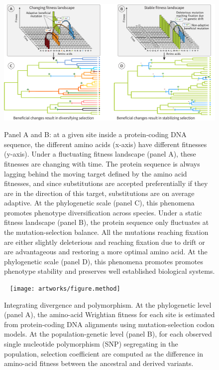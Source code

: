 \documentclass{article}
\begin{document}
    \begin{figure}[!ht]
        \
        \centering
        \includegraphics[width=\textwidth, page=1] {artworks/figure.fitness-landscape}
        \caption{
            Panel A and B: at a given site inside a protein-coding DNA sequence, the different amino acids (x-axis) have different fitnesses (y-axis).
            Under a fluctuating fitness landscape (panel A), these fitnesses are changing with time.
            The protein sequence is always lagging behind the moving target defined by the amino acid fitnesses, and since substitutions are accepted preferentially if they are in the direction of this target, substitutions are on average adaptive.
            At the phylogenetic scale (panel C), this phenomena promotes phenotype diversification across species.
            Under a static fitness landscape (panel B), the protein sequence only fluctuates at the mutation-selection balance.
            All the mutations reaching fixation are either slightly deleterious and reaching fixation due to drift or are advantageous and restoring a more optimal amino acid.
            At the phylogenetic scale (panel D), this phenomena promotes promotes phenotype stability and preserves well established biological systems.
        }
        \label{fig:fitness-landscape}
    \end{figure}

    \begin{figure}[!ht]
        \
        \centering
        \texttt{[image: artworks/figure.method]}
        \caption{
            Integrating divergence and polymorphism.
            At the phylogenetic level (panel A), the amino-acid Wrightian fitness for each site is estimated from protein-coding DNA alignments using mutation-selection codon models.
            At the population-genetic level (panel B), for each observed single nucleotide polymorphism (SNP) segregating in the population, selection coefficient are computed as the difference in amino-acid fitness between the ancestral and derived variants.
        }
        \label{fig:method}
    \end{figure}
\end{document}
